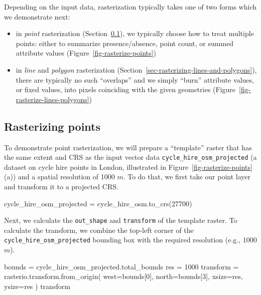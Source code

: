 \documentclass[
  letterpaper,
]{krantz}
\newenvironment{Shaded}{\begin{snugshade}}{\end{snugshade}}
\newcommand{\DecValTok}[1]{\textcolor[rgb]{0.68,0.00,0.00}{#1}}
\newcommand{\NormalTok}[1]{\textcolor[rgb]{0.00,0.23,0.31}{#1}}
\newcommand{\OperatorTok}[1]{\textcolor[rgb]{0.37,0.37,0.37}{#1}}
\providecommand{\tightlist}{%
  \setlength{\itemsep}{0pt}\setlength{\parskip}{0pt}}\usepackage{longtable,booktabs,array}
\begin{document}
Depending on the input data, rasterization typically takes one of two
forms which we demonstrate next:

\begin{itemize}
\tightlist
\item
  in \emph{point} rasterization (Section~\ref{sec-rasterizing-points}),
  we typically choose how to treat multiple points: either to summarize
  presence/absence, point count, or summed attribute values
  (Figure~\ref{fig-rasterize-points})
\item
  in \emph{line} and \emph{polygon} rasterization
  (Section~\ref{sec-rasterizing-lines-and-polygons}), there are
  typically no such ``overlaps'' and we simply ``burn'' attribute
  values, or fixed values, into pixels coinciding with the given
  geometries (Figure~\ref{fig-rasterize-lines-polygons})
\end{itemize}

\subsection{Rasterizing points}\label{sec-rasterizing-points}

To demonstrate point rasterization, we will prepare a ``template''
raster that has the same extent and CRS as the input vector data
\texttt{cycle\_hire\_osm\_projected} (a dataset on cycle hire points in
London, illustrated in Figure~\ref{fig-rasterize-points} (a)) and a
spatial resolution of 1000 \(m\). To do that, we first take our point
layer and transform it to a projected CRS.

\begin{Shaded}
\begin{Highlighting}[]
\NormalTok{cycle\_hire\_osm\_projected }\OperatorTok{=}\NormalTok{ cycle\_hire\_osm.to\_crs(}\DecValTok{27700}\NormalTok{)}
\end{Highlighting}
\end{Shaded}

Next, we calculate the \texttt{out\_shape} and \texttt{transform} of the
template raster. To calculate the transform, we combine the top-left
corner of the \texttt{cycle\_hire\_osm\_projected} bounding box with the
required resolution (e.g., 1000 \(m\)).

\begin{Shaded}
\begin{Highlighting}[]
\NormalTok{bounds }\OperatorTok{=}\NormalTok{ cycle\_hire\_osm\_projected.total\_bounds}
\NormalTok{res }\OperatorTok{=} \DecValTok{1000}
\NormalTok{transform }\OperatorTok{=}\NormalTok{ rasterio.transform.from\_origin(}
\NormalTok{    west}\OperatorTok{=}\NormalTok{bounds[}\DecValTok{0}\NormalTok{], }
\NormalTok{    north}\OperatorTok{=}\NormalTok{bounds[}\DecValTok{3}\NormalTok{], }
\NormalTok{    xsize}\OperatorTok{=}\NormalTok{res, }
\NormalTok{    ysize}\OperatorTok{=}\NormalTok{res}
\NormalTok{)}
\NormalTok{transform}
\end{Highlighting}
\end{Shaded}
\end{document}
